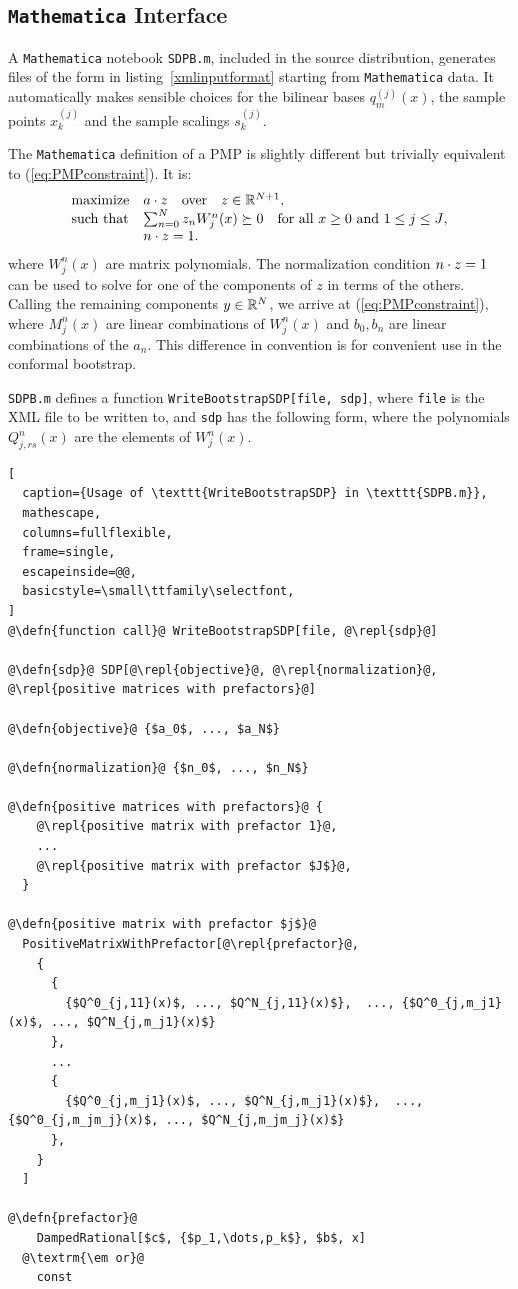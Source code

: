\documentclass[12pt]{article}
\numberwithin{equation}{section}
\renewcommand{\be}{\begin{eqnarray}}
\renewcommand{\ee}{\end{eqnarray}}
\newcommand\repl[1]{$\langle$\textrm{\em #1}$\rangle$}
\newcommand\defn[1]{\textrm{\em #1}\ $\equiv$}
\begin{document}
\subsection{\texttt{Mathematica} Interface}

A \texttt{Mathematica} notebook \texttt{SDPB.m}, included in the source distribution, generates files of the form in listing~\ref{xmlinputformat} starting from \texttt{Mathematica} data.  It automatically makes sensible choices for the bilinear bases $q_m^{(j)}(x)$, the sample points $x_k^{(j)}$ and the sample scalings $s_k^{(j)}$.

The \texttt{Mathematica} definition of a PMP is slightly different but trivially equivalent to (\ref{eq:PMPconstraint}).  It is:
\be
\label{eq:PMPconstraintMathematica}
\begin{array}{ll}
\textrm{maximize} & a\.z\quad\textrm{over}\quad z \in \R^{N+1},\\
\textrm{such that} & \sum_{n=0}^{N} z_n W^n_j(x) \succeq 0 \quad \textrm{for all $x\geq 0$ and $1 \leq j \leq J$},\\
 & n\.z = 1.
\end{array}
\ee
where $W_j^n(x)$ are matrix polynomials.  The normalization condition $n\.z=1$ can be used to solve for one of the components of $z$ in terms of the others.  Calling the remaining components $y\in \R^N$, we arrive at (\ref{eq:PMPconstraint}), where $M_j^n(x)$ are linear combinations of $W^n_j(x)$ and $b_0,b_n$ are linear combinations of the $a_n$.  This difference in convention is for convenient use in the conformal bootstrap.

\texttt{SDPB.m} defines a function \texttt{WriteBootstrapSDP[file, sdp]}, where \texttt{file} is the XML file to be written to, and \texttt{sdp} has the following form, where the polynomials $Q^n_{j,rs}(x)$ are the elements of $W_j^n(x)$.

\begin{lstlisting}[
  caption={Usage of \texttt{WriteBootstrapSDP} in \texttt{SDPB.m}},
  mathescape,
  columns=fullflexible,
  frame=single,
  escapeinside=@@,
  basicstyle=\small\ttfamily\selectfont,
]
@\defn{function call}@ WriteBootstrapSDP[file, @\repl{sdp}@]

@\defn{sdp}@ SDP[@\repl{objective}@, @\repl{normalization}@, @\repl{positive matrices with prefactors}@]

@\defn{objective}@ {$a_0$, ..., $a_N$}

@\defn{normalization}@ {$n_0$, ..., $n_N$}

@\defn{positive matrices with prefactors}@ {
    @\repl{positive matrix with prefactor 1}@,
    ...
    @\repl{positive matrix with prefactor $J$}@,
  }

@\defn{positive matrix with prefactor $j$}@
  PositiveMatrixWithPrefactor[@\repl{prefactor}@,
    {
      {
        {$Q^0_{j,11}(x)$, ..., $Q^N_{j,11}(x)$},  ..., {$Q^0_{j,m_j1}(x)$, ..., $Q^N_{j,m_j1}(x)$}
      },
      ...
      {
        {$Q^0_{j,m_j1}(x)$, ..., $Q^N_{j,m_j1}(x)$},  ..., {$Q^0_{j,m_jm_j}(x)$, ..., $Q^N_{j,m_jm_j}(x)$}
      },
    }
  ]
  
@\defn{prefactor}@
    DampedRational[$c$, {$p_1,\dots,p_k$}, $b$, x]
  @\textrm{\em or}@
    const  
\end{lstlisting}
\end{document}
